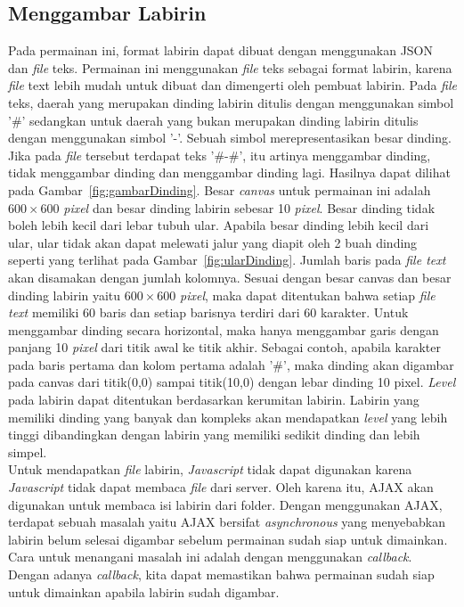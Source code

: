 \subsection{Menggambar Labirin}
Pada permainan ini, format labirin dapat dibuat dengan menggunakan JSON dan \textit{file} teks. Permainan ini menggunakan \textit{file} teks sebagai format labirin, karena \textit{file} text lebih mudah untuk dibuat dan dimengerti oleh pembuat labirin.
Pada \textit{file} teks, daerah yang merupakan dinding labirin ditulis dengan menggunakan simbol '\#' sedangkan untuk daerah yang bukan merupakan dinding labirin ditulis dengan menggunakan simbol '-'. Sebuah simbol merepresentasikan besar dinding. Jika pada \textit{file} tersebut terdapat teks '\#-\#', itu artinya menggambar dinding, tidak menggambar dinding dan menggambar dinding lagi. Hasilnya dapat dilihat pada Gambar~\ref{fig:gambarDinding}. Besar \textit{canvas} untuk permainan ini adalah $600 \times 600$ \textit{pixel} dan besar dinding labirin sebesar 10 \textit{pixel}. Besar dinding tidak boleh lebih kecil dari lebar tubuh ular. Apabila besar dinding lebih kecil dari ular, ular tidak akan dapat melewati jalur yang diapit oleh 2 buah dinding seperti yang terlihat pada Gambar~\ref{fig:ularDinding}. Jumlah baris pada \textit{file text} akan disamakan dengan jumlah kolomnya. Sesuai dengan besar canvas dan besar dinding labirin yaitu $600 \times 600$ \textit{pixel}, maka dapat ditentukan bahwa setiap \textit{file text} memiliki 60 baris dan setiap barisnya terdiri dari 60 karakter. Untuk menggambar dinding secara horizontal, maka hanya menggambar garis dengan panjang 10 \textit{pixel} dari titik awal ke titik akhir. Sebagai contoh, apabila karakter pada baris pertama dan kolom pertama adalah '\#', maka dinding akan digambar pada canvas dari titik(0,0) sampai titik(10,0) dengan lebar dinding 10 pixel. \textit{Level} pada labirin dapat ditentukan berdasarkan kerumitan labirin. Labirin yang memiliki dinding yang banyak dan kompleks akan mendapatkan \textit{level} yang lebih tinggi dibandingkan dengan labirin yang memiliki sedikit dinding dan lebih simpel. \\

Untuk mendapatkan \textit{file} labirin, \textit{Javascript} tidak dapat digunakan karena \textit{Javascript} tidak dapat membaca \textit{file} dari server. Oleh karena itu, AJAX akan digunakan untuk membaca isi labirin dari folder. Dengan menggunakan AJAX, terdapat sebuah masalah yaitu AJAX bersifat \textit{asynchronous} yang menyebabkan labirin belum selesai digambar sebelum permainan sudah siap untuk dimainkan. Cara untuk menangani masalah ini adalah dengan menggunakan \textit{callback}. Dengan adanya \textit{callback}, kita dapat memastikan bahwa permainan sudah siap untuk dimainkan apabila labirin sudah digambar.\\ 

